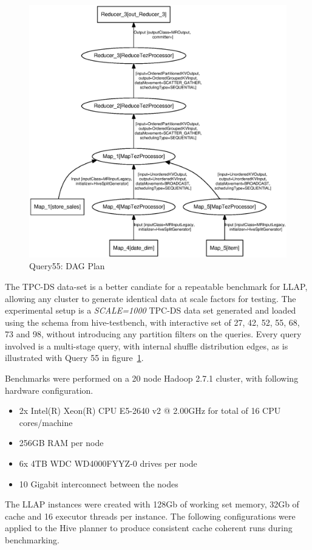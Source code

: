 \begin{figure}[bthp]
\centering
\includegraphics[width=0.8\columnwidth]{figures/q55.eps}
\caption{Query55: DAG Plan}
\label{fig:q55}
\end{figure} 

The TPC-DS data-set is a better candiate for a repeatable benchmark for LLAP, allowing any cluster to generate
identical data at scale factors for testing. The experimental setup is a \emph{SCALE=1000} TPC-DS data set generated
and loaded using the schema from hive-testbench\cite{testbench}, with interactive set of 27, 42, 52, 55, 68, 73 and 98, 
without introducing any partition filters on the queries. Every query involved is a multi-stage query, with internal 
shuffle distribution edges, as is illustrated with Query 55 in figure~\ref{fig:q55}.  

Benchmarks were performed on a 20 node Hadoop 2.7.1 cluster, with following hardware configuration.

\begin{itemize}
\item 2x Intel(R) Xeon(R) CPU E5-2640 v2 @ 2.00GHz for total of 16 CPU cores/machine
\item 256GB RAM per node
\item 6x 4TB WDC WD4000FYYZ-0 drives per node
\item 10 Gigabit interconnect between the nodes
\end{itemize}

The LLAP instances were created with 128Gb of working set memory, 32Gb of cache and 16 executor threads per
instance. The following configurations were applied to the Hive planner to produce consistent cache coherent 
runs during benchmarking.

